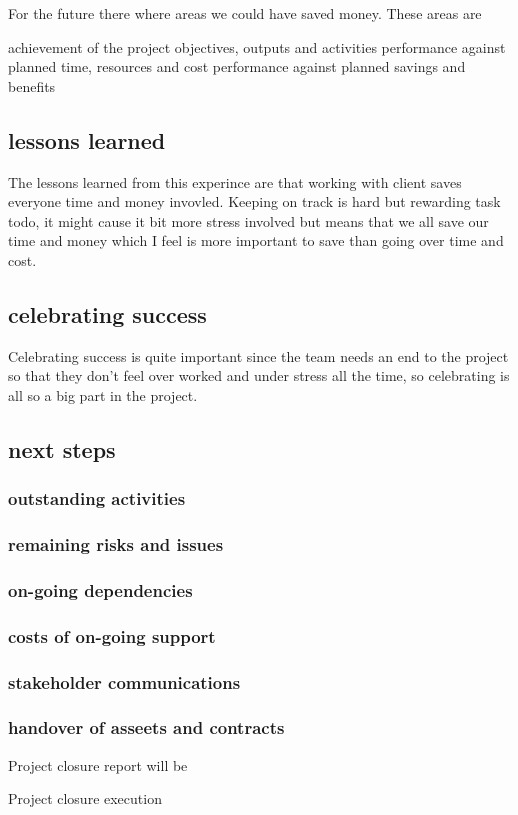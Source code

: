 \documentclass{article}
\begin{document}
For the future there where areas we could have saved money. These areas are

	achievement of the project objectives, outputs and activities
	performance against planned time, resources and cost
	performance against planned savings and benefits

\subsection{lessons learned}
The lessons learned from this experince are that working with client saves everyone time and money invovled. Keeping on track is hard but rewarding task todo, it might cause it bit more stress involved but means that we all save our time and money which I feel is more important to save than going over time and cost.

\subsection{celebrating success}
Celebrating success is quite important since the team needs an end to the project so that they don't feel over worked and under stress all the time, so celebrating is all so a big part in the project.


\subsection{next steps}
\subsubsection{outstanding activities}
\subsubsection{remaining risks and issues}
\subsubsection{on-going dependencies}
\subsubsection{costs of on-going support}
\subsubsection{stakeholder communications}
\subsubsection{handover of asseets  and contracts}




Project closure report will be

Project closure execution 
\end{document}
